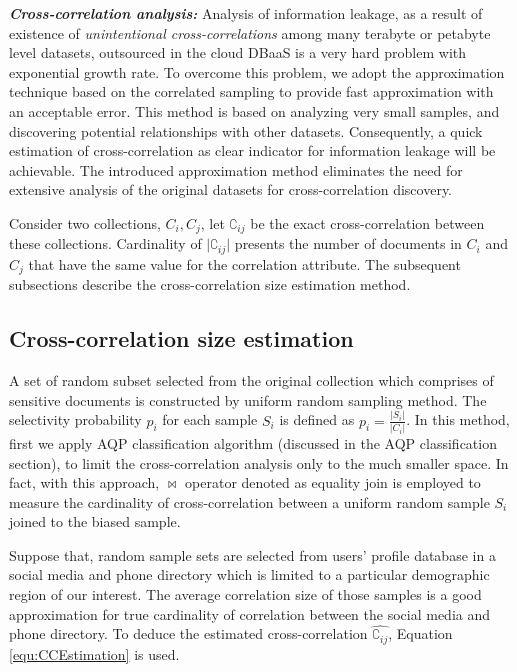 \noindent \textbf{\textit{Cross-correlation analysis:}} Analysis of information leakage, as a result of existence of \emph{unintentional cross-correlations} among many terabyte or petabyte level datasets, outsourced in the cloud DBaaS is a very hard problem with exponential growth rate. To overcome this problem, we adopt the approximation technique based on the correlated sampling to provide fast approximation with an acceptable error. This method is based on analyzing very small samples, and discovering potential relationships with other datasets. Consequently, a quick estimation of cross-correlation as clear indicator for information leakage will be achievable. The introduced approximation method eliminates the need for extensive analysis of the original datasets for cross-correlation discovery.

Consider two collections, $C_i, C_j$, let $\complement_{ij}$ be the exact cross-correlation between these collections. Cardinality of $\vert\complement_{ij}\vert$ presents the number of documents in $C_i$ and $C_j$ that have the same value for the correlation attribute. The subsequent subsections describe the cross-correlation size estimation method. 

\subsection{Cross-correlation size estimation}
\label{correlatedEstimationSubSection}

A set of random subset selected from the original collection which comprises of sensitive documents is constructed by uniform random sampling method. The selectivity probability $p_i$ for each sample $S_i$ is defined as $p_i=\frac{\vert S_i\vert}{\vert C_{i}\vert}$. In this method, first we apply AQP classification algorithm (discussed in the AQP classification section), to limit the cross-correlation analysis only to the much smaller space. In fact, with this approach, $\bowtie$ operator denoted as equality join is employed to measure the cardinality of cross-correlation between a uniform random sample $S_i$ joined to the biased sample. 

Suppose that, random sample sets are selected from users' profile database in a social media and phone directory which is limited to a particular demographic region of our interest. The average correlation size of those samples is a good approximation for true cardinality of correlation between the social media and phone directory. To deduce the estimated cross-correlation $\hat{\complement_{ij}}$,  Equation \ref{equ:CCEstimation} is used.

